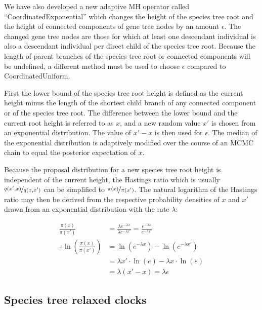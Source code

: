 \documentclass[nogrid]{MBE}%
\begin{document}
We have also developed a new adaptive MH \citep{Andrieu2008} operator called
``CoordinatedExponential'' which changes the height of the species tree root and
the height of connected components of gene tree nodes by an amount $\epsilon$.
The changed gene tree nodes are those for which at least one descendant individual
is also a descendant individual per direct child of the species tree root.
Because the length of parent branches of the species tree root or connected
components will be undefined, a different method must be used to choose
$\epsilon$ compared to CoordinatedUniform.

First the lower bound of the species tree root height is defined as the current
height minus the length of the shortest child branch of any connected component or
of the species tree root. The difference between the lower bound and the current
root height is referred to as $x$, and a new random value $x'$ is chosen from an
exponential distribution. The value of $x' - x$ is then used for $\epsilon$. The
median of the exponential distribution is adaptively modified over the course of
an MCMC chain to equal the posterior expectation of $x$.

Because the proposal distribution for a new species tree root height is
independent of the current height, the Hastings ratio which is usually
$\nicefrac{q(x',x)}{q(x,x')}$ \citep{Hastings1970} can be simplified to
$\nicefrac{\pi(x)}{\pi(x')}$. The natural logarithm of the Hastings ratio may then
be derived from the respective probability densities of $x$ and
$x'$ drawn from an exponential distribution with the rate $\lambda$:

\begin{align}
\frac{\pi(x)}{\pi(x')} &= \frac{\lambda e^{-\lambda x}}{\lambda e^{-\lambda x'}} = \frac{e^{-\lambda x}}{e^{-\lambda x'}}\\
\therefore \ln\left(\frac{\pi(x)}{\pi(x')}\right) &= \ln\left(e^{-\lambda x}\right) - \ln\left(e^{-\lambda x'}\right)\\
& = \lambda x' \cdot \ln\left(e\right) - \lambda x \cdot \ln\left(e\right)\\
& = \lambda \left(x' - x\right) = \lambda \epsilon
\end{align}

\subsection{Species tree relaxed clocks}
\end{document}
